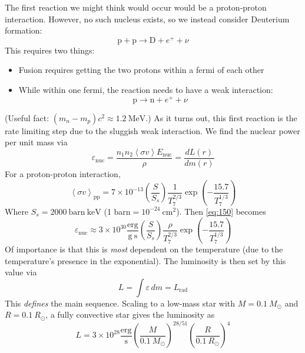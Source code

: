 \documentclass[10pt]{article}
\numberwithin{equation}{section}
\newcommand{\n}{\noindent}
\newcommand{\avg}[1]{\left\langle#1\right\rangle}
\begin{document}
  \n The first reaction we might think would occur would be a
  proton-proton interaction. However, no such nucleus exists, so we
  instead consider Deuterium formation:
  \begin{equation}
    \label{eq:148}
    \mathrm{p+p\to D}+e^++\nu
  \end{equation}
  This requires two things:
  \begin{itemize}
  \item Fusion requires getting the two protons within a fermi of each
    other
  \item While within one fermi, the reaction needs to have a weak
    interaction:
    \begin{equation}
      \label{eq:149}
      \mathrm{p\to n+}e^++\nu
    \end{equation}
  \end{itemize}
  (Useful fact: $(m_n-m_p)c^2\approx 1.2\ \mathrm{MeV}$.) As it turns
  out, this first reaction is the rate limiting step due to the
  sluggish weak interaction. We find the nuclear power per unit mass
  via
  \begin{equation}
    \label{eq:150}
    \varepsilon_{\mathrm{nuc}}=\frac{n_1n_2\avg{\sigma v}E_{\mathrm{nuc}}}{\rho}=\frac{dL(r)}{dm(r)}
  \end{equation}
  For a proton-proton interaction,
  \begin{equation}
    \label{eq:151}
    \avg{\sigma v}_{\mathrm{pp}}=7\times 10^{-13}\left(\frac{S}{S_s}\right)\frac{1}{T_7^{2/3}}\exp\left(-\frac{15.7}{T_7^{1/3}}\right)
  \end{equation}
  Where $S_s=2000\ \mathrm{barn\ keV}$ (1 barn$=10^{-24}\
  \mathrm{cm^2}$). Then \eqref{eq:150} becomes
  \begin{equation}
    \label{eq:152}
    \varepsilon_{\mathrm{nuc}}\approx 3\times
    10^{30}\frac{\mathrm{erg}}{\mathrm{g\ s}}\left(\frac{S}{S_s}\right)\frac{\rho}{T_7^{2/3}}\exp\left(-\frac{15.7}{T_7^{1/3}}\right)
  \end{equation}
  Of importance is that this is \emph{most} dependent on the
  temperature (due to the temperature's presence in the
  exponential). The luminosity is then set by this value via
  \begin{equation}
    \label{eq:153}
    L=\int \varepsilon\,dm=L_{\mathrm{rad}}
  \end{equation}
  This \emph{defines} the main sequence. Scaling to a low-mass star
  with $M=0.1\ M_\odot$ and $R=0.1\ R_\odot$, a fully convective star
  gives the luminosity as
  \begin{equation}
    \label{eq:154}
    L=3\times
    10^{28}\frac{\mathrm{erg}}{\mathrm{s}}\left(\frac{M}{0.1\
        M_\odot}\right)^{28/51}\left(\frac{R}{0.1\ R_\odot}\right)^4
  \end{equation}
\end{document}
